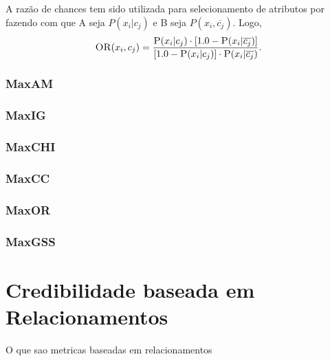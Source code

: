A razão de chances tem sido utilizada para selecionamento de atributos por \cite{Mladenic98} fazendo com que A seja $P(x_i|c_j)$ e B seja $P(x_i,\overline{c_j})$. Logo,
\begin{equation}\label{eqn::or}
   \textsc{OR}(x_i, c_j) = \frac{ \textsc{P}(x_i|c_j) \cdot [ 1.0 - \textsc{P}(x_i|\overline{c_j}) ] }{ [ 1.0 - \textsc{P}(x_i|c_j) ] \cdot \textsc{P}(x_i|\overline{c_j})}.
\end{equation}

\subsubsection{MaxAM}
\label{subsubsection::maxam}

\subsubsection{MaxIG}
\label{subsubsection::maxig}

\subsubsection{MaxCHI}
\label{subsubsection::maxchi}

\subsubsection{MaxCC}
\label{subsubsection::maxcc}

\subsubsection{MaxOR}
\label{subsubsection::maxor}

\subsubsection{MaxGSS}
\label{subsubsection::maxgss}


\section{Credibilidade baseada em Relacionamentos}
\label{sec::pg_cred_baseada_grafos}

O que sao metricas baseadas em relacionamentos

